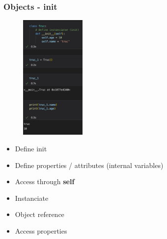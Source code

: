 \begin{frame}\frametitle{Objects - init}
   \begin{minipage}{0.3\linewidth}
      \begin{figure}[H]
         \includegraphics[width=3.2cm]{../images/illustrations/object_simple.jpg}
      \end{figure}
   \end{minipage}
   \begin{minipage}{0.68\linewidth}
      \begin{itemize}
         \item Define init
         \item Define properties / attributes (internal variables)
         \item Access through \textbf{self}
         \item Instanciate
         \item Object reference
         \item Access properties
      \end{itemize}
   \end{minipage}
\end{frame}

